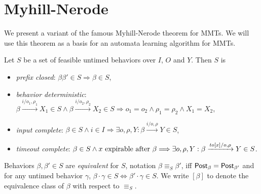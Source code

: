 
\section{Myhill-Nerode}  
We present a variant of the famous Myhill-Nerode theorem for MMTs.
We will use this theorem as a basis for an automata learning algorithm for MMTs.

\begin{definition}
Let $S$ be a set of feasible untimed behaviors over $I$, $O$ and $Y$. Then $S$ is
\begin{itemize}
\item
\emph{prefix closed}: $\beta \beta' \in S \Longrightarrow \beta \in S$,
\item
\emph{behavior deterministic}:
$\beta \xrightarrow{i/o_1, \rho_1} X_1 \in S \wedge \beta \xrightarrow{i/o_2, \rho_2} X_2 \in S \Longrightarrow o_1 = o_2 \wedge \rho_1 = \rho_2 \wedge X_1 = X_2$,
\item
\emph{input complete}:
$\beta \in S \wedge i \in I \Longrightarrow \exists o, \rho, Y : \beta \xrightarrow{i/o, \rho} Y \in S$,
\item
\emph{timeout complete}:
$\beta \in S \wedge x \mbox{ expirable after } \beta \Longrightarrow
\exists o, \rho, Y: \beta \xrightarrow{\mathit{to}[x]/o, \rho} Y \in S$.
\end{itemize}
Behaviors $\beta, \beta' \in S$ are \emph{equivalent} for $S$, notation $\beta \equiv_S \beta'$, iff 
$\mathsf{Post}_{\beta} = \mathsf{Post}_{\beta'}$ and for any untimed behavior
$\gamma$, $\beta \cdot \gamma \in S \Leftrightarrow \beta' \cdot \gamma \in S$.
We write $[\beta]$ to denote the equivalence class of $\beta$ with respect to $\equiv_S$.
\end{definition}

